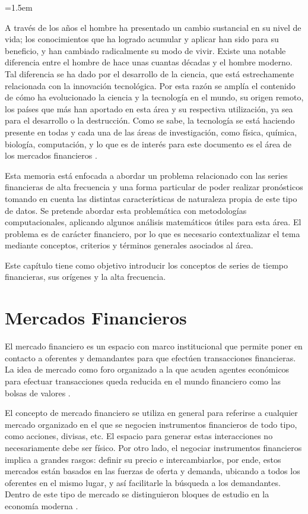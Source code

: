\parindent=1.5em

A través de los años el hombre ha presentado un cambio sustancial en su nivel
de vida; los conocimientos que ha logrado acumular y aplicar han sido para su
beneficio, y han cambiado radicalmente su modo de vivir. Existe una notable
diferencia entre el hombre de hace unas cuantas décadas y el hombre moderno.
Tal diferencia se ha dado por el desarrollo de la ciencia, que está
estrechamente relacionada con la innovación tecnológica. Por esta razón se
amplía el contenido de cómo ha evolucionado la ciencia y la tecnología en el
mundo, su origen remoto, los países que más han aportado en esta área y su
respectiva utilización, ya sea para el desarrollo o la destrucción. Como se
sabe, la tecnología se está haciendo presente en todas y cada una de las áreas
de investigación, como física, química, biología, computación, y lo que es de
interés para este documento es el área de los mercados financieros
\cite{watsham1997quantitative}.

Esta memoria está enfocada a abordar un problema relacionado con las series
financieras de alta frecuencia y una forma particular de poder realizar
pronósticos tomando en cuenta las distintas características de naturaleza
propia de este tipo de datos. Se pretende abordar esta problemática con
metodologías computacionales, aplicando algunos análisis matemáticos útiles
para esta área. El problema es de carácter financiero, por lo que es necesario
contextualizar el tema mediante conceptos, criterios y términos generales
asociados al área.

Este capítulo tiene como objetivo introducir los conceptos de series de tiempo
financieras, sus orígenes y la alta frecuencia.

\section{Mercados Financieros}

El mercado financiero es un espacio con marco institucional que permite poner
en contacto a oferentes y demandantes para que efectúen transacciones
financieras. La idea de mercado como foro organizado a la que acuden agentes
económicos para efectuar transacciones queda reducida en el mundo financiero
como las bolsas de valores \cite{mishkin2006financial}.

El concepto de mercado financiero se utiliza en general para referirse a
cualquier mercado organizado en el que se negocien instrumentos financieros de
todo tipo, como acciones, divisas, etc. El espacio para generar estas
interacciones no necesariamente debe ser físico. Por otro lado, el negociar
instrumentos financieros implica a grandes rasgos: definir su precio e
intercambiarlos, por ende, estos mercados están basados en las fuerzas de
oferta y demanda, ubicando a todos los oferentes en el mismo lugar, y así
facilitarle la búsqueda a los demandantes. Dentro de este tipo de mercado se
distinguieron bloques de estudio en la economía moderna
\cite{jensen1984theory}.

